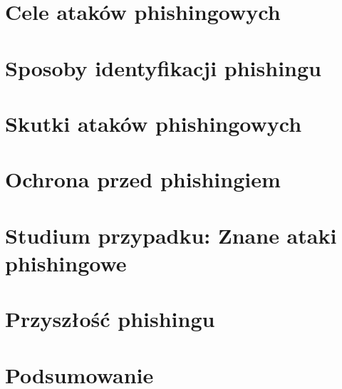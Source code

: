 \documentclass[]{article}
\begin{document}
\newpage
\section{Cele ataków phishingowych}

\newpage
\section{Sposoby identyfikacji phishingu}

\newpage
\section{Skutki ataków phishingowych}

\newpage
\section{Ochrona przed phishingiem}

\newpage
\section{Studium przypadku: Znane ataki phishingowe}

\newpage
\section{Przyszłość phishingu}

\newpage
\section{Podsumowanie}

\newpage


\end{document}
